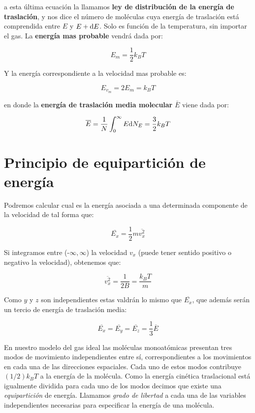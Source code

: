 \documentclass[12pt,a4paper,oneside]{book}
\begin{document}
a esta última ecuación la llamamos \textbf{ley de distribución de la energía de traslación}, y nos dice el número de moléculas cuya energía de traslación está comprendida entre $E$ y $E + \mathrm{d} E$. Solo es función de la temperatura, sin importar el gas. La \textbf{energía mas probable} vendrá dada por:

\begin{equation}
E_m = \dfrac{1}{2} k_B T
\end{equation}

Y la energía correspondiente a la velocidad mas probable es:

\begin{equation}
E_{v_m} = 2 E_m = k_B T
\end{equation}

en donde la \textbf{energía de traslación media molecular } $\bar{E}$ viene dada por:

\begin{equation}
\overline{E} = \dfrac{1}{N} \int_{0}^{\infty} E \mathrm{d} N_E  = \dfrac{3}{2} k_B T
\end{equation}

\section{Principio de equipartición de energía}

Podremos calcular cual es la energía asociada a una determinada componente de la velocidad de tal forma que:

\begin{equation}
\overline{E_x} = \dfrac{1}{2} m \overline{v^2_x}
\end{equation}

Si integramos entre (-$\infty, \infty$) la velocidad $v_x$ (puede tener sentido positivo o negativo la velocidad), obtenemos que:

\begin{equation}
\overline{v^2_x} = \dfrac{1}{2 B} = \dfrac{k_B T}{m}
\end{equation}

Como $y$ y $z$ son independientes estas valdrán lo mismo que $\overline{E_x}$, que además serán un tercio de energía de traslación media:

\begin{equation}
\overline{E_x} = 
\overline{E_y} =
\overline{E_z} = \dfrac{1}{3} \overline{E}
\end{equation}

En nuestro modelo del gas ideal las moléculas monoatómicas presentan tres modos de movimiento independientes entre sí, correspondientes a los movimientos en cada una de las direcciones espaciales. Cada uno de estos modos contribuye $(1/2) k_B T$ a la energía de la molécula. Como la energía cinética traslacional está igualmente dividida para cada uno de los modos decimos que existe una \textit{equipartición} de energía. Llamamos \textit{grado de libertad} a cada una de las variables independientes necesarias para especificar la energía de una molécula. \\
\end{document}
